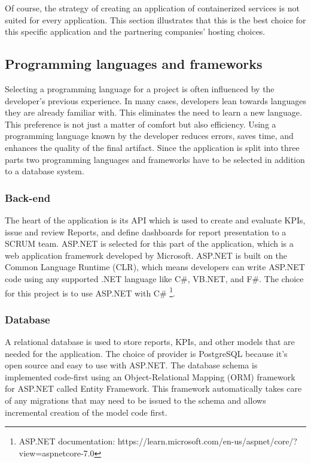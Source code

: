Of course, the strategy of creating an application of containerized services is not suited for every application. 
This section illustrates that this is the best choice for this specific application and the partnering companies' hosting choices.

\subsection{Programming languages and frameworks}

Selecting a programming language for a project is often influenced by the developer's previous experience. 
In many cases, developers lean towards languages they are already familiar with. 
This eliminates the need to learn a new language. 
This preference is not just a matter of comfort but also efficiency. 
Using a programming language known by the developer reduces errors, saves time,
and enhances the quality of the final artifact. 
Since the application is split into three parts two programming languages and frameworks have to be selected in addition to a database system.


\subsubsection{Back-end}

The heart of the application is its API which is used to create and evaluate KPIs, 
issue and review Reports, and define dashboards for report presentation to a SCRUM team. 
ASP.NET is selected for this part of the application, 
which is a web application framework developed by Microsoft. 
ASP.NET is built on the Common Language Runtime (CLR), 
which means developers can write ASP.NET code using any supported .NET language like C\#, 
VB.NET, and F\#. The choice for this project is to use ASP.NET with C\# \footnote{ASP.NET documentation: https://learn.microsoft.com/en-us/aspnet/core/?view=aspnetcore-7.0}.

\subsubsection{Database}

A relational database is used to store reports, 
KPIs, and other models that are needed for the application. 
The choice of provider is PostgreSQL because it's open source and easy to use with ASP.NET. 
The database schema is implemented code-first using an Object-Relational Mapping (ORM) framework for ASP.NET called Entity Framework. 
This framework automatically takes care of any migrations that may need to be issued to the schema and allows incremental creation of the model code first.

